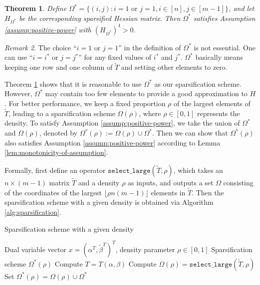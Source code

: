 \documentclass{article}
\theoremstyle{plain}
\newtheorem{theorem}{Theorem}[section]
\theoremstyle{definition}
\theoremstyle{remark}
\newtheorem{remark}[theorem]{Remark}
\begin{document}
\begin{theorem}
\label{thm:1row-1col-assumption}
Define $\Omega^* = \{(i, j): i = 1 \text{ or } j = 1,i \in [n], j \in [m-1] \}$, and let $H_{\Omega^*}$ be the corresponding sparsified Hessian matrix. Then $\Omega^*$ satisfies Assumption \ref{assump:positive-power} with $(H_{\Omega^*})^4 > 0$.
\end{theorem}

\begin{remark}
The choice ``$i=1 \text{ or } j=1$'' in the definition of $\Omega^*$ is not essential. One can use ``$i=i^* \text{ or } j=j^*$'' for any fixed values of $i^*$ and $j^*$. $\Omega^*$ basically means keeping one row and one column of $\tilde{T}$ and setting other elements to zero.
\end{remark}

Theorem \ref{thm:1row-1col-assumption} shows that it is reasonable to use $\Omega^*$ as our sparsification scheme. However, $\Omega^*$ may contain too few elements to provide a good approximation to $H$. For better performance, we keep a fixed proportion $\rho$ of the largest elements of $\tilde{T}$, leading to a sparsification scheme $\Omega(\rho)$, where $\rho \in [0, 1]$ represents the density. To satisfy Assumption \ref{assump:positive-power}, we take the union of $\Omega^*$ and $\Omega(\rho)$, denoted by $\Omega^{*}(\rho) := \Omega(\rho) \cup \Omega^{*}$.
Then we can show that $\Omega^{*}(\rho)$ also satisfies Assumption \ref{assump:positive-power} according to Lemma \ref{lem:monotonicity-of-assumption}.

Formally, first define an operator $\texttt{select\_large}(\tilde{T}, \rho)$, which takes an $n\times (m-1)$ matrix $\tilde{T}$ and a density $\rho$ as inputs, and outputs a set $\Omega$ consisting of the coordinates of the largest $\lfloor \rho n (m-1) \rfloor$ elements in $\tilde{T}$. Then the sparsification scheme with a given density is obtained via Algorithm \ref{alg:sparsification}.

\begin{algorithm}[h]
    \caption{Sparsification scheme with a given density}
    \label{alg:sparsification}
    \begin{algorithmic}[1]
        \REQUIRE Dual variable vector $x = (\alpha^T, \tilde{\beta}^T)^T$, density parameter $\rho \in [0, 1]$
        \ENSURE Sparsification scheme $\Omega^{*}(\rho)$
        \STATE Compute $T = T(\alpha, \beta)$
        \STATE Compute $\Omega(\rho) = \texttt{select\_large}(\tilde{T}, \rho)$
        \STATE Set $\Omega^{*}(\rho) = \Omega(\rho) \cup \Omega^{*}$
    \end{algorithmic}
\end{algorithm}
\end{document}
